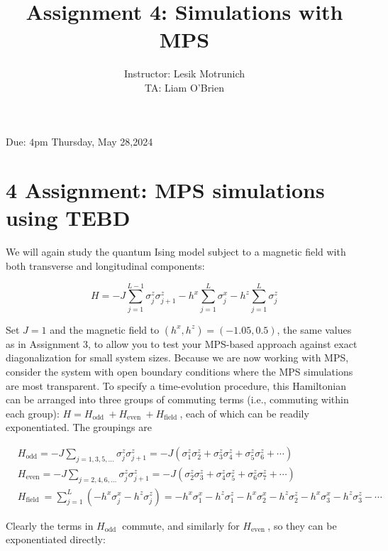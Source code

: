 \documentclass[12pt]{article}
\title{Assignment 4: Simulations with MPS }
\author{Instructor: Lesik Motrunich\\
TA: Liam O'Brien}
\date{}
\begin{document}
\maketitle
Due: $4 \mathrm{pm}$ Thursday, May 28,2024



\section*{4 Assignment: MPS simulations using TEBD}
We will again study the quantum Ising model subject to a magnetic field with both transverse and longitudinal components:


\begin{equation*}
H=-J \sum_{j=1}^{L-1} \sigma_{j}^{z} \sigma_{j+1}^{z}-h^{x} \sum_{j=1}^{L} \sigma_{j}^{x}-h^{z} \sum_{j=1}^{L} \sigma_{j}^{z} \tag{15}
\end{equation*}


Set $J=1$ and the magnetic field to $\left(h^{x}, h^{z}\right)=(-1.05,0.5)$, the same values as in Assignment 3, to allow you to test your MPS-based approach against exact diagonalization for small system sizes. Because we are now working with MPS, consider the system with open boundary conditions where the MPS simulations are most transparent. To specify a time-evolution procedure, this Hamiltonian can be arranged into three groups of commuting terms (i.e., commuting within each group): $H=H_{\text {odd }}+H_{\text {even }}+H_{\text {field }}$, each of which can be readily exponentiated. The groupings are


\begin{align*}
& H_{\mathrm{odd}}=-J \sum_{j=1,3,5, \ldots} \sigma_{j}^{z} \sigma_{j+1}^{z}=-J\left(\sigma_{1}^{z} \sigma_{2}^{z}+\sigma_{3}^{z} \sigma_{4}^{z}+\sigma_{5}^{z} \sigma_{6}^{z}+\cdots\right)  \tag{16}\\
& H_{\mathrm{even}}=-J \sum_{j=2,4,6, \ldots} \sigma_{j}^{z} \sigma_{j+1}^{z}=-J\left(\sigma_{2}^{z} \sigma_{3}^{z}+\sigma_{4}^{z} \sigma_{5}^{z}+\sigma_{6}^{z} \sigma_{7}^{z}+\cdots\right)  \tag{17}\\
& H_{\text {field }}=\sum_{j=1}^{L}\left(-h^{x} \sigma_{j}^{x}-h^{z} \sigma_{j}^{z}\right)=-h^{x} \sigma_{1}^{x}-h^{z} \sigma_{1}^{z}-h^{x} \sigma_{2}^{x}-h^{z} \sigma_{2}^{z}-h^{x} \sigma_{3}^{x}-h^{z} \sigma_{3}^{z}-\cdots \tag{18}
\end{align*}


Clearly the terms in $H_{\text {odd }}$ commute, and similarly for $H_{\text {even }}$, so they can be exponentiated directly:
\end{document}

